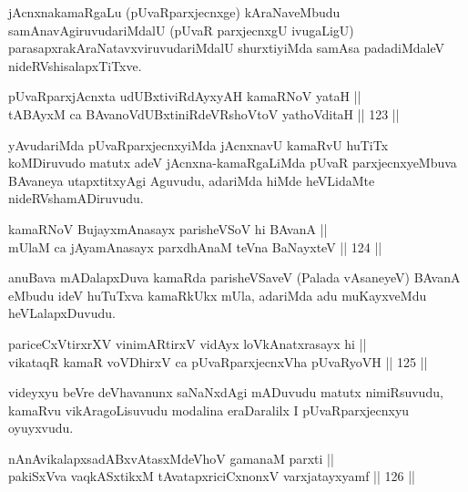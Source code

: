 \begin{artha}
jAcnxnakamaRgaLu (pUvaRparxjecnxge) kAraNaveMbudu
samAnavAgiruvudariMdalU (pUvaR parxjecnxgU ivugaLigU)
parasapxrakAraNatavxviruvudariMdalU shurxtiyiMda samAsa padadiMdaleV
nideRVshisalapxTiTxve.
\end{artha}

\begin{shl}
pUvaRparxjAcnxta udUBxtiviRdAyxyAH kamaRNoV yataH || \\
tABAyxM ca BAvanoVdUBxtiniRdeVRshoV\s toV yathoVditaH \hfill || 123 ||  
\end{shl}

\begin{artha}
yAvudariMda pUvaRparxjecnxyiMda jAcnxnavU kamaRvU huTiTx koMDiruvudo
matutx adeV jAcnxna-kamaRgaLiMda pUvaR parxjecnxyeMbuva BAvaneya
utapxtitxyAgi Aguvudu, adariMda hiMde heVLidaMte nideRVshamADiruvudu.
\end{artha}


\begin{shl}
kamaRNoV BujayxmAnasayx parisheVSoV hi BAvanA || \\
mUlaM ca jAyamAnasayx parxdhAnaM teVna BaNayxteV \hfill || 124 ||  
\end{shl}

\begin{artha}
anuBava mADalapxDuva kamaRda parisheVSaveV (Palada vAsaneyeV) BAvanA
eMbudu ideV huTuTxva kamaRkUkx mUla, adariMda adu muKayxveMdu
heVLalapxDuvudu.
\end{artha}

\begin{shl}
pariceCxVtirxrXV vinimARtirxV vidAyx loVkAnatxrasayx hi || \\
vikataqR kamaR voVDhirxV ca pUvaRparxjecnxVha pUvaRyoVH \hfill || 125 ||  
\end{shl}	

\begin{artha}
videyxyu beVre deVhavanunx saNaNxdAgi mADuvudu matutx nimiRsuvudu,
kamaRvu vikAragoLisuvudu  modalina eraDaralilx I pUvaRparxjecnxyu
oyuyxvudu.
\end{artha}


\begin{shl}
nAnAvikalapxsadABxvAtasxMdeVhoV gamanaM parxti || \\
\footnotemark[1]pakiSxVva vaqkASxtikxM tAvatapxriciCxnonxV varxjatayxyamf \hfill || 126 ||  
\end{shl}


